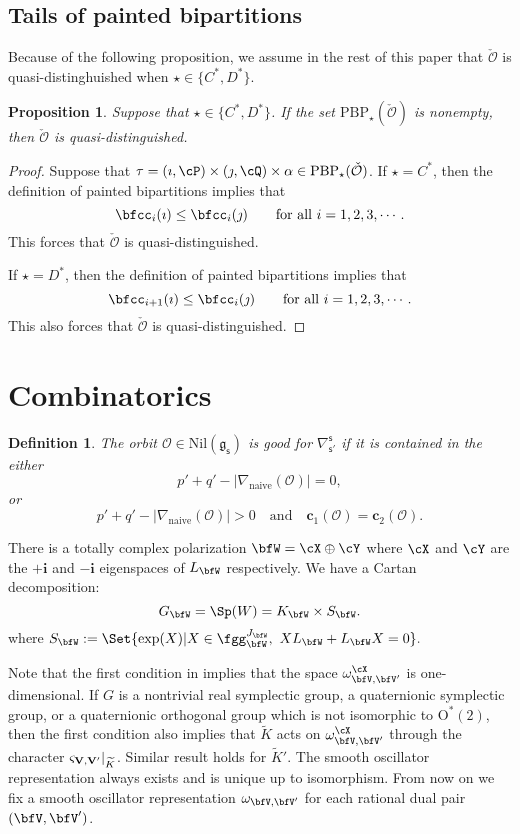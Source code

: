 \documentclass[12pt,a4paper]{amsart}
\def\abs#1{\left|{#1}\right|}
\newcommand{\CO}{{\mathcal {O}}}
\newcommand{\g}{\mathfrak g}
\def\DD{\nabla}
\numberwithin{equation}{section}
\newtheorem{prop}[thm]{Proposition}
\newtheorem{defn}[thm]{Definition}
\theoremstyle{remark}
\def\abfV{\bfV'}
\def\mktvvp{\varsigma_{{\bf V},{\bf V}'}}
\begin{document}
\subsection{Tails of painted bipartitions}
Because of the following proposition, we assume in the rest of this paper that $\check \CO$ is quasi-distinghuished  when $\star\in \{C^*, D^*\}$.


\begin{prop}
  Suppose that $\star\in \{C^*, D^*\}$. If the set $\mathrm{PBP}_\star(\check \CO)$ is nonempty, then $\check \CO$ is quasi-distinguished.
\end{prop}
\begin{proof}
  Suppose that $\tau=(\imath,\cP)\times(\jmath,\cQ)\times \alpha \in  \mathrm{PBP}_\star(\check \CO)$. If  $\star=C^*$, then  the definition of painted bipartitions implies that
 \[
 \bfcc_i(\imath)\leq \bfcc_i(\jmath) \qquad \textrm{for all } i=1,2,3, \cdots.
 \]
This forces that $\check \CO$ is quasi-distinguished.

 If  $\star=D^*$, then  the definition of painted bipartitions implies that
 \[
 \bfcc_{i+1}(\imath)\leq \bfcc_i(\jmath) \qquad \textrm{for all } i=1,2,3, \cdots.
 \]
This  also forces that   $\check \CO$ is quasi-distinguished.
 \end{proof}



\section{Combinatorics}\label{sec:comANDgeo}



\begin{defn}
The orbit $\CO\in \mathrm{Nil}(\g_\mathsf s)$ is good for $\DD_{\mathsf s'}^{\mathsf s}$ if it is contained in the either
\[
p'+q'-\abs{\DD_\mathrm{naive}(\CO)}= 0,
\]
or
\[
p'+q'-\abs{\DD_\mathrm{naive}(\CO)}>0\quad \textrm{and}\quad  \mathbf c_1(\CO)=\mathbf c_2(\CO).
\]

\end{defn}


There is a totally complex
polarization $\bfW = \cX\oplus \cY$ where $\cX$ and $\cY$ are the $+\mathbf i$ and $-\mathbf i$
eigenspaces  of $L_{\bfW}$ respectively.
We have a Cartan decomposition:
\[
   G_{\bfW}=\Sp(W)=K_{\bfW}\times S_{\bfW}.
\]
where
$
 S_{\bfW}:=\Set{\exp(X) | X\in \fgg_{\bfW}^{J_\bfW}, \ X L_{\bfW}+L_{\bfW} X=0}.
$



Note that the first condition in  implies that the space
$\omega_{\bfV,\abfV}^{\cX}$ is one-dimensional. If $G$ is a nontrivial real symplectic group, a quaternionic symplectic group, or a quaternionic orthogonal group which is not isomorphic to $\mathrm O^*(2)$, then the first condition also implies that $\widetilde K$ acts on $\omega_{\bfV,\abfV}^{\cX}$ through the character $\mktvvp|_{\widetilde K}$. Similar result holds for $\widetilde K'$.  The smooth oscillator representation always exists and  is unique up to
isomorphism. From now on we  fix a smooth oscillator representation
$\omega_{\bfV,\abfV}$ for each rational dual pair $(\bfV,\abfV)$.
\end{document}

